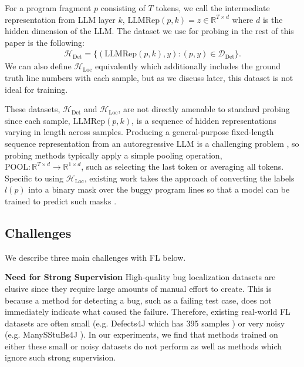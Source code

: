 For a program fragment $p$ consisting of $T$ tokens, we call the intermediate representation from LLM layer $k$, $\text{LLMRep}(p, k) = z \in\mathbb{R}^{T\times d}$ where $d$ is the hidden dimension of the LLM. The dataset we use for probing in the rest of this paper is the following:
\begin{align*}
    \mathcal{H}_{\text{Det}} = \{(\text{LLMRep}(p, k), y) : (p, y)\in\mathcal{D}_\text{Det}\}.
\end{align*}
We can also define $\mathcal{H}_\text{Loc}$ equivalently which additionally includes the ground truth line numbers with each sample, but as we discuss later, this dataset is not ideal for training.

These datasets, $\mathcal{H}_\text{Det}$ and $\mathcal{H}_\text{Loc}$, are not directly amenable to standard probing since each sample, $\text{LLMRep}(p, k)$, is a sequence of hidden representations varying in length across samples.
Producing a general-purpose fixed-length sequence representation from an autoregressive LLM is a challenging problem \cite{liu2023meaning}, so probing methods typically apply a simple pooling operation, $\text{POOL}:\mathbb{R}^{T\times d}\rightarrow \mathbb{R}^{1\times d}$, such as selecting the last token or averaging all tokens. Specific to using $\mathcal{H}_\text{Loc}$, existing work takes the approach of converting the labels $l(p)$ into a binary mask over the buggy program lines so that a model can be trained to predict such masks \citep{llmao}.



\subsection{Challenges}

We describe three main challenges with FL below.

\textbf{Need for Strong Supervision}
High-quality bug localization datasets are elusive since they require large amounts of manual effort to create. This is because a method for detecting a bug, such as a failing test case, does not immediately indicate what caused the failure. Therefore, existing real-world FL datasets are often small (e.g. Defects4J which has 395 samples \citep{defects4j}) or very noisy (e.g. ManySStuBs4J \citep{karampatsis2020often}). In our experiments, we find that methods trained on either these small or noisy datasets do not perform as well as methods which ignore such strong supervision.

